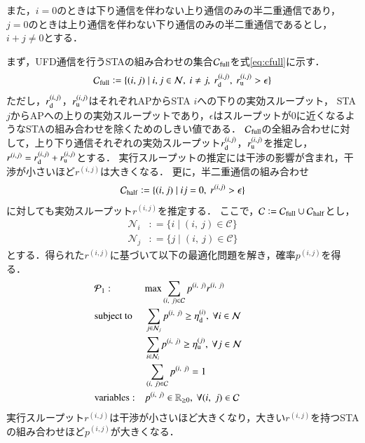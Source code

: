 \documentclass[master]{kuisthesis}		%
\newcommand{\sij}{(i,j)}
\newcommand{\pij}{p^{(i,j)}}
\newcommand{\rd}{r^{\sij}_{\rm d}}
\newcommand{\ru}{r^{\sij}_{\rm u}}
\newcommand{\rij}{r^{\sij}}
\def\equiv{\mathrel{\mathop:}=}
\begin{document}
			また，$i=0$のときは下り通信を伴わない上り通信のみの半二重通信であり，
			$j=0$のときは上り通信を伴わない下り通信のみの半二重通信であるとし，
			$i+j\neq0$とする．
			\par
			まず，UFD通信を行うSTAの組み合わせの集合${\mathcal C}_{\rm full}$を式\eqref{eq:cfull}に示す．
			\begin{equation}
				{\mathcal C}_{\rm full} \equiv \{\sij\mid i,j\in{\mathcal N},\ i\neq j,\ r^{\sij}_{\rm d},\ r^{\sij}_{\rm u}>\epsilon\} \label{eq:cfull}
			\end{equation}
			ただし，$r_{\rm d}^{\sij}$，$r_{\rm u}^{\sij}$はそれぞれAPからSTA $i$への下りの実効スループット，
			STA $j$からAPへの上りの実効スループットであり，$\epsilon$はスループットが0に近くなるようなSTAの組み合わせを除くためのしきい値である．
			${\mathcal C}_{\rm full}$の全組み合わせに対して，上り下り通信それぞれの実効スループット$\rd$，$\ru$を推定し，$\rij=\rd + \ru$とする．
			実行スループットの推定には干渉の影響が含まれ，干渉が小さいほど$\rij$は大きくなる．
			更に，半二重通信の組み合わせ
			\begin{equation}
				{\mathcal C}_{\rm half} \equiv \{\sij\mid ij=0,\ \rij >\epsilon\}
			\end{equation}
			に対しても実効スループット$\rij$を推定する．
			ここで，${\mathcal C} \equiv {\mathcal C}_{\rm full} \cup {\mathcal C}_{\rm half}$とし，
			\begin{align}
				{\mathcal N}_i &\equiv \{i\mid(i,\ j)\in{\mathcal C}\}\\
				{\mathcal N}_j &\equiv \{j\mid(i,\ j)\in{\mathcal C}\}
			\end{align}
			とする．得られた$\rij$に基づいて以下の最適化問題を解き，確率$\pij$を得る．
			\begin{align}
				&{\mathcal P}_1: && {\rm max} \sum_{(i,\ j)\in{\mathcal C}} p^{(i,\ j)}r^{(i,\ j)} &&&&&& \label{eq:p1}\\
				&{\rm subject\ to} && \sum_{j\in{\mathcal N}_j} p^{(i,\ j)} \geq \eta_{\rm d}^{(i)},\ \forall i\in {\mathcal N} \label{eq:pd} \\
				&&& \sum_{i\in{\mathcal N}_i} p^{(i,\ j)} \geq \eta_{\rm u}^{(j)},\ \forall j\in {\mathcal N} \label{eq:pu}\\
				&&& \sum_{(i,\ j)\in{\mathcal C}} p^{(i,\ j)}=1 \\
				&{\rm variables:} &&p^{(i,\ j)} \in {\mathbb R}_{\geq 0},\ \forall(i,\ j)\in {\mathcal C} \nonumber
			\end{align}
			実行スループット$\rij$は干渉が小さいほど大きくなり，大きい$\rij$を持つSTAの組み合わせほど$p^{\sij}$が大きくなる．
\end{document}
